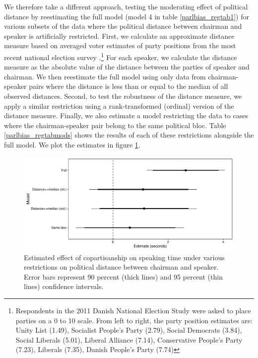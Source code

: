 \documentclass[12pt,a4paper]{article}
\begin{document}
We therefore take a different approach, testing the moderating effect of political distance by reestimating the full model (model 4 in table \ref{parlbias_regtab1}) for various subsets of the data where the political distance between chairman and speaker is artificially restricted.  First, we calculate an approximate distance measure based on averaged voter estimates of party positions from the most recent national election survey \citep{Stubager2013}.\footnote{Respondents in the 2011 Danish National Election Study were asked to place parties on a 0 to 10 scale. From left to right, the party position estimates are: Unity List (1.49), Socialist People's Party (2.79), Social Democrats (3.84), Social Liberals (5.01), Liberal Alliance (7.14), Conservative People's Party (7.23), Liberals (7.35), Danish People's Party (7.74)} For each speaker, we calculate the distance measure as the absolute value of the distance between the parties of speaker and chairman. We then reestimate the full model using only data from chairman-speaker pairs where the distance is less than or equal to the median of all observed distances. Second, to test the robustness of the distance measure, we apply a similar restriction using a rank-transformed (ordinal) version of the distance measure. Finally, we also estimate a model restricting the data to cases where the chairman-speaker pair belong to the same political bloc. Table \ref{parlbias_regtabmods} shows the results of each of these restrictions alongside the full model. We plot the estimates in figure \ref{parlbias_modeffectplot}.



\begin{figure}[!htbp]
\centering
\includegraphics[scale=.65]{../figures/parlbias_modeffectplot}
  \caption{Estimated effect of copartisanship on speaking time under various restrictions on political distance between chairman and speaker. Error bars represent 90 percent (thick lines) and 95 percent (thin lines) confidence intervals.}\label{parlbias_modeffectplot}
\end{figure}
\end{document}
